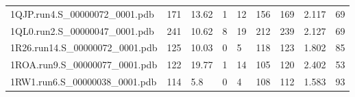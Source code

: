 \documentclass{bioinfo}
\begin{document}
\begin{table*}[!t]
{\begin{tabular}{lllllllll}
    1QJP.run4.S\_00000072\_0001.pdb & 171      & 13.62      & 1           & 12          & 156         & 169     & 2.117           & 69           \\
    1QL0.run2.S\_00000047\_0001.pdb & 241      & 10.62      & 8           & 19          & 212         & 239     & 2.127           & 69           \\
    1R26.run14.S\_00000072\_0001.pdb & 125      & 10.03      & 0           & 5           & 118         & 123     & 1.802           & 85           \\
    1ROA.run9.S\_00000077\_0001.pdb & 122      & 19.77      & 1           & 14          & 105         & 120     & 2.402           & 53           \\
    1RW1.run6.S\_00000038\_0001.pdb & 114      & 5.8        & 0           & 4           & 108         & 112     & 1.583           & 93           \\
\end{tabular}}{}
\end{table*}
\end{document}
